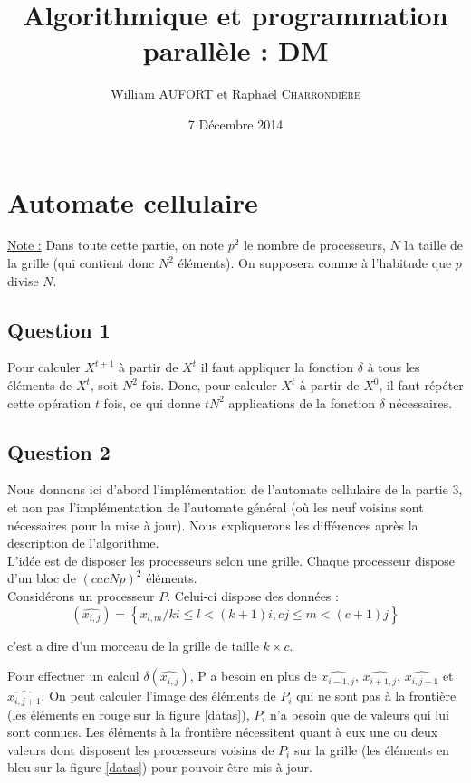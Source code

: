 \documentclass{article}
\title{Algorithmique et programmation parallèle : DM}
\author{William \textsc{AUFORT} et Raphaël \textsc{Charrondière}}
\date{7 Décembre 2014}
\begin{document}
\maketitle

\section{Automate cellulaire}

\underline{Note :} Dans toute cette partie, on note $p^2$ le nombre de processeurs, $N$ la taille de la grille (qui contient donc $N^2$ éléments).
On supposera comme à l'habitude que $p$ divise $N$.

\subsection*{Question 1}

Pour calculer $X^{t+1}$ à partir de $X^t$ il faut appliquer la fonction $\delta$ à tous les éléments de $X^t$, soit $N^2$ fois.
Donc, pour calculer $X^t$ à partir de $X^0$, il faut répéter cette opération $t$ fois, ce qui donne $t N^2$ applications de la fonction $\delta$ nécessaires.

\subsection*{Question 2}

Nous donnons ici d'abord l'implémentation de l'automate cellulaire de la partie 3, et non pas l'implémentation de l'automate général (où les neuf voisins sont nécessaires pour la mise à jour). Nous expliquerons les différences après la description de l'algorithme. \\

L'idée est de disposer les processeurs selon une grille. Chaque processeur dispose d'un bloc de $\left( cac{N}{p} \right) ^2$ éléments.\\

Considérons un processeur $P$. Celui-ci dispose des données :
$$(\widehat{x_{i,j}})= \left\{ x_{l,m} / ki\leq l<(k+1)i,cj\leq m<(c+1)j \right\}$$

c'est a dire d'un morceau de la grille de taille $k \times c$.

Pour effectuer un calcul $\delta(\widehat{x_{i,j}})$, P a besoin en plus de $\widehat{x_{i-1,j}}$, $\widehat{x_{i+1,j}}$, $\widehat{x_{i,j-1}}$ et $\widehat{x_{i,j+1}}$.
On peut calculer l'image des éléments de $P_i$ qui ne sont pas à la frontière (les éléments en rouge sur la figure \ref{datas}), $P_i$ n'a besoin que de valeurs qui lui sont connues.
Les éléments à la frontière nécessitent quant à eux une ou deux valeurs dont disposent les processeurs voisins de $P_i$ sur la grille (les éléments en bleu sur la figure \ref{datas}) pour pouvoir être mis à jour.
\end{document}
